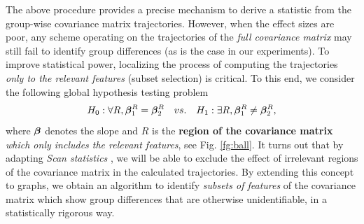 
The above procedure provides a precise mechanism to derive a statistic from the group-wise covariance matrix trajectories.
However, when the effect sizes are poor, any scheme operating on 
the trajectories of the {\em full covariance matrix} may still fail to identify group differences (as is the case in our experiments). To improve statistical power, localizing the process of computing the trajectories {\em 
  only to the relevant features} (subset selection) is critical. 
%
%
To this end, we consider the following global hypothesis testing problem
\begin{equation*}
H_0: \forall R, \bm{\beta}_1^R=\bm{\beta}_2^R \quad vs. \quad H_1: \exists R, \bm{\beta}_1^R\ne\bm{\beta}_2^R,
\end{equation*}       
where $\bm{\beta}$ denotes the slope and $R$ is the \textbf{region of the covariance matrix}
{\em which only includes the relevant features}, see Fig. \ref{fg:ball}.
It turns out that by adapting {\em Scan statistics} \citep{fan2012control, arias2011detection}, we will be able to exclude the effect of irrelevant regions of the covariance 
matrix in the calculated trajectories. 
By extending this concept to graphs, we obtain an algorithm to identify {\em subsets of features} of the covariance matrix which show group differences that 
are otherwise unidentifiable, in a statistically rigorous way. 

